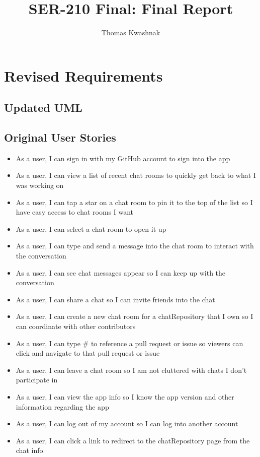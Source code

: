 \documentclass{report}
\title{SER-210 Final: Final Report}
\author{Thomas Kwashnak}
\begin{document}
\maketitle
\tableofcontents
\newpage

\chapter{Revised Requirements}

\section{Updated UML}


\section{Original User Stories}
\begin{itemize}
    \item As a user, I can sign in with my GitHub account to sign into the app
    \item As a user, I can view a list of recent chat rooms to quickly get back to what I was working on
    \item As a user, I can tap a star on a chat room to pin it to the top of the list so I have easy access to chat rooms I want
    \item As a user, I can select a chat room to open it up
    \item As a user, I can type and send a message into the chat room to interact with the conversation
    \item As a user, I can see chat messages appear so I can keep up with the conversation
    \item As a user, I can share a chat so I can invite friends into the chat
    \item As a user, I can create a new chat room for a chatRepository that I own so I can coordinate with other contributors
    \item As a user, I can type \# to reference a pull request or issue so viewers can click and navigate to that pull request or issue
    \item As a user, I can leave a chat room so I am not cluttered with chats I don't participate in
    \item As a user, I can view the app info so I know the app version and other information regarding the app
    \item As a user, I can log out of my account so I can log into another account
    \item As a user, I can click a link to redirect to the chatRepository page from the chat info
\end{itemize}
\end{document}
